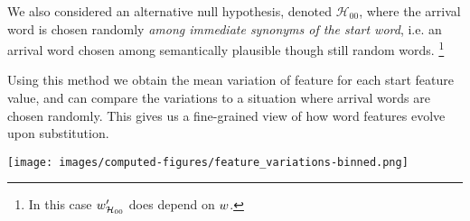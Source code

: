 We also considered an alternative null hypothesis, denoted $\mathcal{H}_{00}$, where the arrival word is chosen randomly \emph{among immediate synonyms of the start word}, i.e. an arrival word chosen among semantically plausible though still random words.
\footnote{In this case $w'_{\mathcal{H}_{00}}$ does depend on $w$.} 

Using this method we obtain the mean variation of feature for each start feature value, and can compare the variations to a situation where arrival words are chosen randomly.
This gives us a fine-grained view of how word features evolve upon substitution.


\begin{figure*}[!th]
    \centering
    \texttt{[image: images/computed-figures/feature\_variations-binned.png]}
    \caption{\textbf{Feature variation upon substitution:} average feature of the appearing word minus $\mathcal{H}_0$ \emph{v.} average feature of the disappearing word in a substitution, with 95\% asymptotic confidence intervals.
    The overall position of the curve with respect to $y = 0$ indicates the direction of the cognitive bias.
    The fact that all the curves have positive slopes shows the influence of the disappearing word on the appearing word (indeed, the contraposition is that selection of the appearing word independently from the disappearing word would produce horizontal curves).
    Finally, the fact that all the curves also have slopes smaller than 1 means that the substitution operation is contractile on average: each feature will converge towards its own specific asymptotic range, which is consistent with the evolution observed in Figure~\ref{fig:timebags-evolution}.}
    \label{fig:feature-variations}
\end{figure*}


